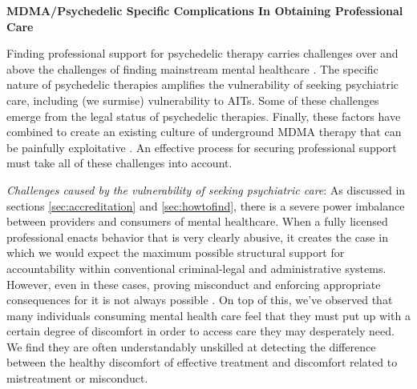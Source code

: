 \documentclass[12pt,letterpaper]{book}
\begin{document}
\noindent \textbf{MDMA/Psychedelic Specific Complications In Obtaining Professional Care}
\label{sec:mdmaTherapistComplications}

Finding professional support for psychedelic therapy carries challenges over and above the challenges of finding mainstream mental healthcare \cite{studyingHarms,patientVulnerability}. The specific nature of psychedelic therapies amplifies the vulnerability of seeking psychiatric care, including (we surmise) vulnerability to AITs. Some of these challenges emerge from the legal status of psychedelic therapies. Finally, these factors have combined to create an existing culture of underground MDMA therapy that can be painfully exploitative \cite{powerTrip}. An effective process for securing professional support must take all of these challenges into account.

\textit{Challenges caused by the vulnerability of seeking psychiatric care}: As discussed in sections \ref{sec:accreditation} and \ref{sec:howtofind}, there is a severe power imbalance between providers and consumers of mental healthcare. When a fully licensed professional enacts behavior that is very clearly abusive, it creates the case in which we would expect the maximum possible structural support for accountability within conventional criminal-legal and administrative systems. However, even in these cases, proving misconduct and enforcing appropriate consequences for it is not always possible \cite{biaggio1998obstacles}. On top of this, we've observed that many individuals consuming mental health care feel that they must put up with a certain degree of discomfort in order to access care they may desperately need. We find they are often understandably unskilled at detecting the difference between the healthy discomfort of effective treatment \cite{eckerUnlocking} and discomfort related to mistreatment or misconduct. 
\end{document}
